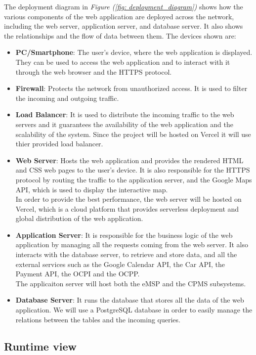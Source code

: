 \documentclass[table, 12pt]{article}
\begin{document}
The deployment diagram in \textit{Figure (\ref{fig: deployment_diagram})} shows how the various components of the web application are deployed across the network, including the web server, application server, and database server. It also shows the relationships and the flow of data between them.
The devices shown are:
\begin{itemize}
    \item \textbf{PC/Smartphone}: The user's device, where the web application is displayed. They can be used to access the web application and to interact with it through the web browser and the HTTPS protocol.
    \item \textbf{Firewall}: Protects the network from unauthorized access. It is used to filter the incoming and outgoing traffic.
    \item \textbf{Load Balancer}: It is used to distribute the incoming traffic to the web servers and it guarantees the availability of the web application and the scalability of the system. Since the project will be hosted on Vercel it will use thier provided load balancer.
    \item \textbf{Web Server}: Hosts the web application and provides the rendered HTML and CSS web pages to the user's device. It is also responsible for the HTTPS protocol by routing the traffic to the application server, and the Google Maps API, which is used to display the interactive map.\\In order to provide the best performance, the web server will be hosted on Vercel, which is a cloud platform that provides serverless deployment and global distribution of the web application.
    \item \textbf{Application Server}: It is responsible for the business logic of the web application by managing all the requests coming from the web server. It also interacts with the database server, to retrieve and store data, and all the external services such as the Google Calendar API, the Car API, the Payment API, the OCPI and the OCPP.\\ The applicaiton server will host both the eMSP and the CPMS subsystems.
    \item \textbf{Database Server}: It runs the database that stores all the data of the web application. We will use a PostgreSQL database in order to easily manage the relations between the tables and the incoming queries.
\end{itemize}
\newpage

\subsection{Runtime view}
\end{document}
